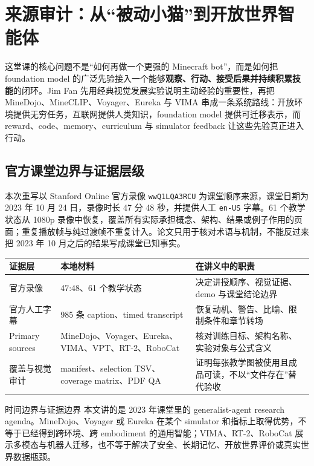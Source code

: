 \documentclass[a4paper]{article}
\begin{document}
\makecscover

\section{来源审计：从“被动小猫”到开放世界智能体}

这堂课的核心问题不是“如何再做一个更强的 Minecraft bot”，而是如何把 foundation model 的广泛先验接入一个能够\textbf{观察、行动、接受后果并持续积累技能}的闭环。Jim Fan 先用经典视觉发展实验说明主动经验的重要性，再把 MineDojo、MineCLIP、Voyager、Eureka 与 VIMA 串成一条系统路线：开放环境提供无穷任务，互联网提供人类知识，foundation model 提供可迁移表示，而 reward、code、memory、curriculum 与 simulator feedback 让这些先验真正进入行动。

\subsection{官方课堂边界与证据层级}

本次重写以 Stanford Online 官方录像 \texttt{wwQ1LQA3RCU} 为课堂顺序来源，课堂日期为 2023 年 10 月 24 日，录像时长 47 分 48 秒，并提供人工 \texttt{en-US} 字幕。61 个教学状态从 1080p 录像中恢复，覆盖所有实际承担概念、架构、结果或例子作用的页面；重复播放帧与纯过渡帧不重复计入。论文只用于核对术语与机制，不能反过来把 2023 年 10 月之后的结果写成课堂已知事实。

\begin{longtable}{@{}L{0.18\textwidth}L{0.31\textwidth}L{0.40\textwidth}@{}}
\toprule
证据层 & 本地材料 & 在讲义中的职责 \\
\midrule
官方录像 & 47:48、61 个教学状态 & 决定讲授顺序、视觉证据、demo 与课堂结论边界 \\
官方人工字幕 & 985 条 caption、timed transcript & 恢复动机、警告、比喻、限制条件和章节转场 \\
Primary sources & MineDojo、Voyager、Eureka、VIMA、VPT、RT-2、RoboCat & 核对训练目标、架构名称、实验对象与公式含义 \\
覆盖与视觉审计 & manifest、selection TSV、coverage matrix、PDF QA & 证明每张教学图被使用且成品可读，不以“文件存在”替代验收 \\
\bottomrule
\end{longtable}

\begin{warningbox}{时间边界与证据边界}
本文讲的是 2023 年课堂里的 generalist-agent research agenda。MineDojo、Voyager 或 Eureka 在某个 simulator 和指标上取得优势，不等于已经得到跨环境、跨 embodiment 的通用智能；VIMA、RT-2、RoboCat 展示多模态与机器人迁移，也不等于解决了安全、长期记忆、开放世界评价或真实世界数据瓶颈。
\end{warningbox}
\end{document}
